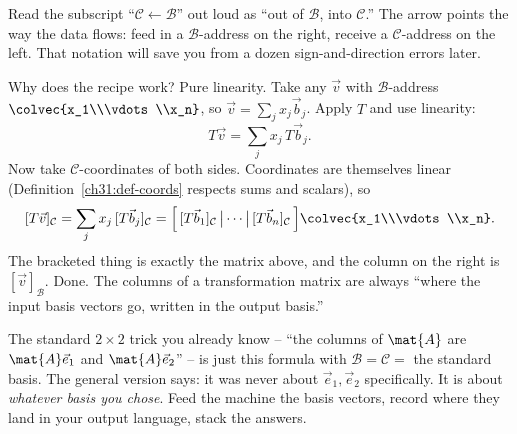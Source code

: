 Read the subscript ``$\mathcal{C}\leftarrow\mathcal{B}$'' out loud as ``out of
$\mathcal{B}$, into $\mathcal{C}$.'' The arrow points the way the data flows: feed
in a $\mathcal{B}$-address on the right, receive a $\mathcal{C}$-address on the
left. That notation will save you from a dozen sign-and-direction errors later.

Why does the recipe work? Pure linearity. Take any $\vec{v}$ with
$\mathcal{B}$-address $\colvec{x_1\\\vdots\\x_n}$, so
$\vec{v}=\sum_j x_j\vec{b}_j$. Apply $T$ and use linearity:
\[
  T\vec{v} = \sum_{j} x_j\, T\vec{b}_j.
\]
Now take $\mathcal{C}$-coordinates of both sides. Coordinates are themselves
linear (Definition~\ref{ch31:def-coords} respects sums and scalars), so
\[
  [T\vec{v}]_{\mathcal{C}} = \sum_j x_j\,[T\vec{b}_j]_{\mathcal{C}}
  = \Big[\,[T\vec{b}_1]_{\mathcal{C}}\,\big|\cdots\big|\,[T\vec{b}_n]_{\mathcal{C}}\,\Big]\colvec{x_1\\\vdots\\x_n}.
\]
The bracketed thing is exactly the matrix above, and the column on the right is
$[\vec{v}]_{\mathcal{B}}$. Done. The columns of a transformation matrix are always
``where the input basis vectors go, written in the output basis.''

\begin{intuitionbox}
The standard $2\times 2$ trick you already know -- ``the columns of $\mat{A}$ are
$\mat{A}\vec{e}_1$ and $\mat{A}\vec{e}_2$'' -- is just this formula with
$\mathcal{B}=\mathcal{C}=$ the standard basis. The general version says: it was
never about $\vec{e}_1,\vec{e}_2$ specifically. It is about \emph{whatever basis
you chose}. Feed the machine the basis vectors, record where they land in your
output language, stack the answers.
\end{intuitionbox}

